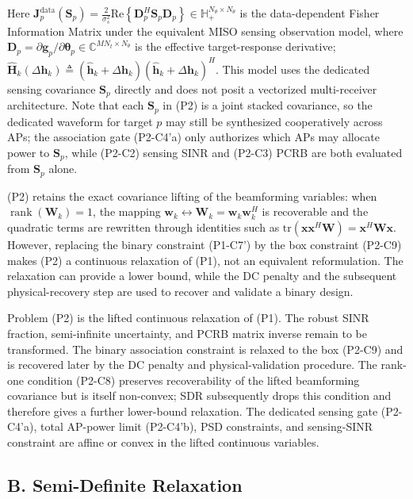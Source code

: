 \documentclass[12pt,a4paper]{article}
\newcommand{\vect}[1]{\mathbf{#1}}
\newcommand{\mat}[1]{\mathbf{#1}}
\newcommand{\tr}{\text{tr}}
\newcommand{\Real}{\text{Re}}
\DeclareMathOperator{\rank}{rank}
\begin{document}
Here $\mat{J}_p^{\text{data}}(\mat{S}_p) = \frac{2}{\sigma_s^2} \Real\!\left\{ \mat{D}_p^H \mat{S}_p \mat{D}_p \right\} \in \mathbb{H}_+^{N_\theta \times N_\theta}$ is the data-dependent Fisher Information Matrix under the equivalent MISO sensing observation model, where $\mat{D}_p = \partial \vect{g}_p / \partial \boldsymbol{\theta}_p \in \mathbb{C}^{MN_t \times N_\theta}$ is the effective target-response derivative; $\hat{\mat{H}}_k(\Delta\vect{h}_k) \triangleq (\hat{\vect{h}}_k + \Delta\vect{h}_k)(\hat{\vect{h}}_k + \Delta\vect{h}_k)^H$. This model uses the dedicated sensing covariance $\mat{S}_p$ directly and does not posit a vectorized multi-receiver architecture. Note that each $\mat{S}_p$ in (P2) is a joint stacked covariance, so the dedicated waveform for target $p$ may still be synthesized cooperatively across APs; the association gate (P2-C4'a) only authorizes which APs may allocate power to $\mat{S}_p$, while (P2-C2) sensing SINR and (P2-C3) PCRB are both evaluated from $\mat{S}_p$ alone.

(P2) retains the exact covariance lifting of the beamforming variables: when $\rank(\mat{W}_k)=1$, the mapping $\vect{w}_k \leftrightarrow \mat{W}_k=\vect{w}_k\vect{w}_k^H$ is recoverable and the quadratic terms are rewritten through identities such as $\tr(\vect{x}\vect{x}^H\mat{W})=\vect{x}^H\mat{W}\vect{x}$. However, replacing the binary constraint (P1-C7') by the box constraint (P2-C9) makes (P2) a continuous relaxation of (P1), not an equivalent reformulation. The relaxation can provide a lower bound, while the DC penalty and the subsequent physical-recovery step are used to recover and validate a binary design.

Problem (P2) is the lifted continuous relaxation of (P1). The robust SINR fraction, semi-infinite uncertainty, and PCRB matrix inverse remain to be transformed. The binary association constraint is relaxed to the box (P2-C9) and is recovered later by the DC penalty and physical-validation procedure. The rank-one condition (P2-C8) preserves recoverability of the lifted beamforming covariance but is itself non-convex; SDR subsequently drops this condition and therefore gives a further lower-bound relaxation. The dedicated sensing gate (P2-C4'a), total AP-power limit (P2-C4'b), PSD constraints, and sensing-SINR constraint are affine or convex in the lifted continuous variables.

\subsection*{B. Semi-Definite Relaxation}
\end{document}
